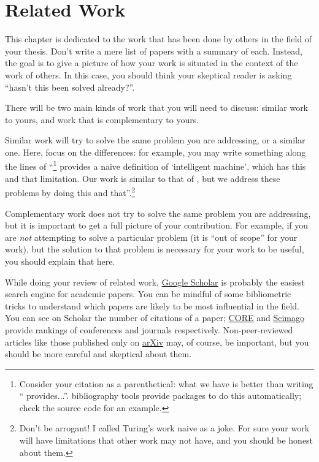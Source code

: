 \chapter{Related Work}
\label{sec:related}

This chapter is dedicated to the work that has been done by others in the field of your thesis.
Don't write a mere list of papers with a summary of each. Instead, the goal is to give a picture
of how your work is situated in the context of the work of others. In this case, you should
think your skeptical reader is asking ``hasn't this been solved already?''.

There will be two main kinds of work that you will need to discuss: similar work
to yours, and work that is complementary to yours.

Similar work will try to solve the same problem you are addressing, or a similar one.
Here, focus on the differences: for example, you may write something along the
lines of ``\textcite{DBLP:journals/x/Turing50}\footnote{Consider your citation as a parenthetical: what we have is better than writing ``\textcite{DBLP:journals/x/Turing50} provides...''. \latex bibliography tools provide packages to do this automatically; check the source code for an example.}
provides a naive definition of
`intelligent machine', which has this and that limitation. Our work is similar to that of
\citeauthor{DBLP:journals/x/Turing50}, but we address these problems by doing this and
that''.\footnote{Don't be arrogant! I called Turing's work naive as a joke.
For sure your work will have limitations that other work
may not have, and you should be honest about them.}

Complementary work does not try to solve the same problem you are addressing, but it is
important to get a full picture of your contribution. For example, if you are
\emph{not} attempting to solve a particular problem (it is ``out of scope'' for your work),
but the solution to that problem is necessary for your work to be useful, you should explain
that here.

While doing your review of related work, \href{https://scholar.google.com}{Google Scholar}
is probably the easiest search engine for academic papers. You can be mindful of some
bibliometric tricks to understand which papers are likely to be most influential in the field.
You can see on Scholar the number of citations of a paper;
\href{https://portal.core.edu.au/conf-ranks/}{CORE} and
\href{https://www.scimagojr.com}{Scimago} provide rankings of conferences and journals
respectively. Non-peer-reviewed articles like those published only on
\href{https://arxiv.org}{arXiv} may, of course, be important, but you should be more careful
and skeptical about them.

